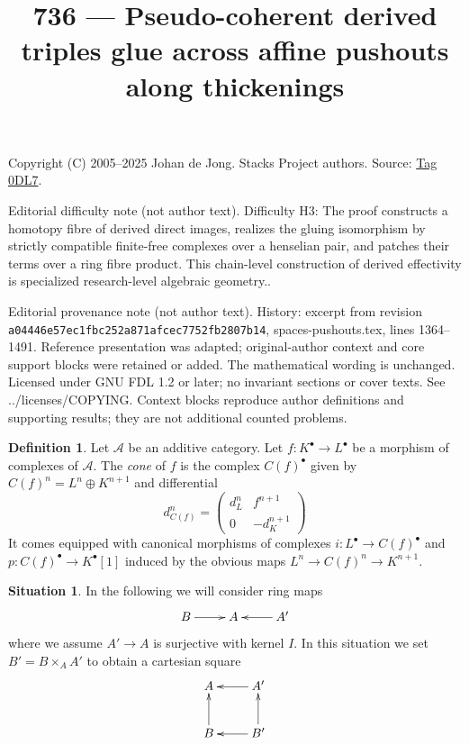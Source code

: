 \documentclass{amsart}
\theoremstyle{plain}
\theoremstyle{definition}
\newtheorem{definition}[subsection]{Definition}
\newtheorem{situation}[subsection]{Situation}
\theoremstyle{remark}
\numberwithin{equation}{subsection}
\begin{document}
\title[Stacks Project, Tag 0DL7]{736 --- Pseudo-coherent derived triples glue across affine pushouts along thickenings}
\maketitle
\noindent Copyright (C) 2005--2025 Johan de Jong. Stacks Project authors. Source: \href{https://stacks.math.columbia.edu/tag/0DL7}{Tag 0DL7}.

\noindent Editorial difficulty note (not author text). Difficulty H3: The proof constructs a homotopy fibre of derived direct images, realizes the gluing isomorphism by strictly compatible finite-free complexes over a henselian pair, and patches their terms over a ring fibre product. This chain-level construction of derived effectivity is specialized research-level algebraic geometry..

\noindent Editorial provenance note (not author text). History: excerpt from revision \texttt{a0444\allowbreak 6e57e\allowbreak c1fbc\allowbreak 252a8\allowbreak 71afc\allowbreak ec775\allowbreak 2fb28\allowbreak 07b14}, spaces-pushouts.tex, lines 1364--1491. Reference presentation was adapted; original-author context and core support blocks were retained or added. The mathematical wording is unchanged. Licensed under GNU FDL 1.2 or later; no invariant sections or cover texts. See ../licenses/COPYING. Context blocks reproduce author definitions and supporting results; they are not additional counted problems.

\begin{definition}
\label{derived-definition-cone}
Let $\mathcal{A}$ be an additive category.
Let $f : K^\bullet \to L^\bullet$ be a morphism of
complexes of $\mathcal{A}$. The {\it cone} of $f$
is the complex $C(f)^\bullet$ given by
$C(f)^n = L^n \oplus K^{n + 1}$ and
differential
$$
d_{C(f)}^n =
\left(
\begin{matrix}
d^n_L & f^{n + 1} \\
0 & -d_K^{n + 1}
\end{matrix}
\right)
$$
It comes equipped with canonical morphisms of complexes
$i : L^\bullet \to C(f)^\bullet$ and $p : C(f)^\bullet \to K^\bullet[1]$
induced by the obvious maps $L^n \to C(f)^n \to K^{n + 1}$.
\end{definition}

\begin{situation}
\label{more-algebra-situation-module-over-fibre-product}
In the following we will consider ring maps
$$
\xymatrix{
B \ar[r] & A & A' \ar[l]
}
$$
where we assume $A' \to A$ is surjective with kernel $I$.
In this situation we set $B' = B \times_A A'$ to
obtain a cartesian square
$$
\xymatrix{
A & A' \ar[l] \\
B \ar[u] & B' \ar[l] \ar[u]
}
$$
\end{situation}
\end{document}
